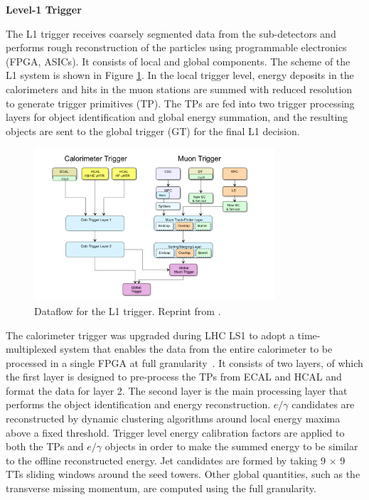 \documentclass[thesis.tex]{subfiles}
\begin{document}
\noindent \textbf{Level-1 Trigger}

The L1 trigger receives coarsely segmented data from the sub-detectors and performs rough reconstruction of the particles using programmable electronics (FPGA, ASICs).
It consists of local and global components. 
The scheme of the L1 system is shown in Figure \ref{fig:L1}.
In the local trigger level, energy deposits in the calorimeters and hits in the muon stations are summed with reduced resolution to generate trigger primitives (TP). 
The TPs are fed into two trigger processing layers for object identification and global energy summation, and the resulting objects are sent to the global trigger (GT) for the final L1 decision.

\begin{figure}[hbtp]
	\centering
	\includegraphics[width=0.8\textwidth]{plot/L1flow.png}
	\caption{Dataflow for the L1 trigger. Reprint from \cite{Tapper:1556311}.}
	\label{fig:L1}
\end{figure}


The calorimeter trigger was upgraded during LHC LS1 to adopt a time-multiplexed system that enables the data from the entire calorimeter to be processed in a single FPGA at full granularity~\cite{Zabi}.
It consists of two layers, of which the first layer is designed to pre-process the TPs from ECAL and HCAL and format the data for layer 2.
The second layer is the main processing layer that performs the object identification and energy reconstruction. 
$e/\gamma$ candidates are reconstructed by dynamic clustering algorithms around local energy maxima above a fixed threshold. 
Trigger level energy calibration factors are applied to both the TPs and $e/\gamma$ objects in order to make the summed energy to be similar to the offline reconstructed energy. 
Jet candidates are formed by taking 9 $\times$ 9 TTs sliding windows around the seed towers. 
Other global quantities, such as the transverse missing momentum, are computed using the full granularity.
\end{document}
